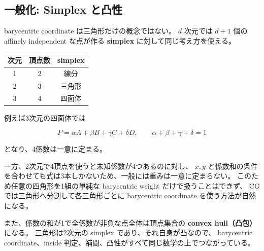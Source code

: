 \documentclass[a4paper,11pt]{ltjsarticle}
\begin{document}
\subsection{一般化: Simplex と凸性}

barycentric coordinate は三角形だけの概念ではない。
$d$ 次元では $d+1$ 個の affinely independent な点が作る
\textbf{simplex} に対して同じ考え方を使える。

\begin{center}
\begin{tabular}{c|c|c}
次元 & 頂点数 & simplex \\
\hline
1 & 2 & 線分 \\
2 & 3 & 三角形 \\
3 & 4 & 四面体
\end{tabular}
\end{center}

例えば3次元の四面体では

\[
  P=\alpha A+\beta B+\gamma C+\delta D,
  \qquad
  \alpha+\beta+\gamma+\delta=1
\]

となり、4係数は一意に定まる。

一方、2次元で4頂点を使うと未知係数が4つあるのに対し、
$x,y$ と係数和の条件を合わせても式は3本しかないため、一般には重みは一意に定まらない。
このため任意の四角形を1組の単純な barycentric weight だけで扱うことはできず、
CG では三角形へ分割して各三角形ごとに barycentric coordinate を使う方法が自然になる。

また、係数の和が1で全係数が非負な点全体は頂点集合の
\textbf{convex hull（凸包）}になる。
三角形は2次元の simplex であり、それ自身が凸なので、
barycentric coordinate、inside 判定、補間、凸性がすべて同じ数学の上でつながっている。
\end{document}
